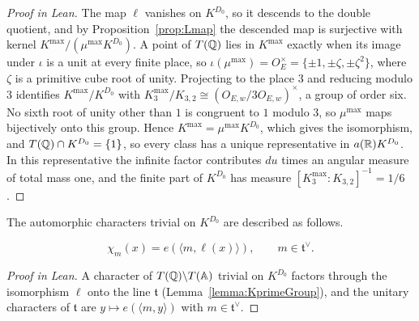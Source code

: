 \begin{proof}[Proof in Lean]

\leanok


The map $\ell$ vanishes on $K^{D_0}$, so it descends to the double quotient, and by Proposition~\ref{prop:Lmap} the descended map is surjective with kernel $K^{\mathrm{max}}/(\mu^{\mathrm{max}}K^{D_0})$. A point of $T(\mathbb{Q})$ lies in $K^{\mathrm{max}}$ exactly when its image under $\iota$ is a unit at every finite place, so $\iota(\mu^{\mathrm{max}})=O_E^\times=\{\pm1,\pm\zeta,\pm\zeta^2\}$, where $\zeta$ is a primitive cube root of unity. Projecting to the place $3$ and reducing modulo $3$ identifies $K^{\mathrm{max}}/K^{D_0}$ with $K_3^{\mathrm{max}}/K_{3,2}\cong(O_{E,w}/3O_{E,w})^\times$, a group of order six. No sixth root of unity other than $1$ is congruent to $1$ modulo $3$, so $\mu^{\mathrm{max}}$ maps bijectively onto this group. Hence $K^{\mathrm{max}}=\mu^{\mathrm{max}}K^{D_0}$, which gives the isomorphism, and $T(\mathbb{Q})\cap K^{D_0}=\{1\}$, so every class has a unique representative in $a(\mathbb{R})K^{D_0}$. In this representative the infinite factor contributes $du$ times an angular measure of total mass one, and the finite part of $K^{D_0}$ has measure $[K_3^{\mathrm{max}}:K_{3,2}]^{-1}=1/6$.

\end{proof}

\begin{equationnode}

\label{eqn:chimdefn}


\leanok

The automorphic characters trivial on $K^{D_0}$ are described as follows.

\begin{equation*} \chi_m(x)=e(\langle m,\ell(x)\rangle), \qquad m\in\mathfrak t^\vee. \end{equation*}

\end{equationnode}

\begin{proof}[Proof in Lean]

\leanok


A character of $T(\mathbb{Q})\backslash T(\mathbb{A})$ trivial on $K^{D_0}$ factors through the isomorphism $\ell$ onto the line $\mathfrak t$ (Lemma~\ref{lemma:KprimeGroup}), and the unitary characters of $\mathfrak t$ are $y\mapsto e(\langle m,y\rangle)$ with $m\in\mathfrak t^\vee$.

\end{proof}

